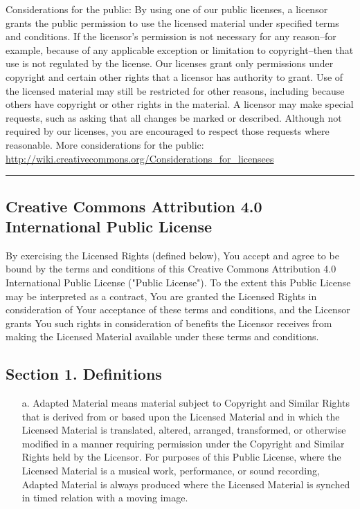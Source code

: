 \begin{scriptsize}
     Considerations for the public: By using one of our public
     licenses, a licensor grants the public permission to use the
     licensed material under specified terms and conditions. If
     the licensor's permission is not necessary for any reason--for
     example, because of any applicable exception or limitation to
     copyright--then that use is not regulated by the license. Our
     licenses grant only permissions under copyright and certain
     other rights that a licensor has authority to grant. Use of
     the licensed material may still be restricted for other
     reasons, including because others have copyright or other
     rights in the material. A licensor may make special requests,
     such as asking that all changes be marked or described.
     Although not required by our licenses, you are encouraged to
     respect those requests where reasonable. More considerations
     for the public:
	\url{http://wiki.creativecommons.org/Considerations_for_licensees}\\

\hrule

\subsection*{Creative Commons Attribution 4.0 International Public License}

By exercising the Licensed Rights (defined below), You accept and agree
to be bound by the terms and conditions of this Creative Commons
Attribution 4.0 International Public License ("Public License"). To the
extent this Public License may be interpreted as a contract, You are
granted the Licensed Rights in consideration of Your acceptance of
these terms and conditions, and the Licensor grants You such rights in
consideration of benefits the Licensor receives from making the
Licensed Material available under these terms and conditions.


\subsection*{Section 1. Definitions}

\begin{itemize}
  \item[a.] Adapted Material means material subject to Copyright and Similar
     Rights that is derived from or based upon the Licensed Material
     and in which the Licensed Material is translated, altered,
     arranged, transformed, or otherwise modified in a manner requiring
     permission under the Copyright and Similar Rights held by the
     Licensor. For purposes of this Public License, where the Licensed
     Material is a musical work, performance, or sound recording,
     Adapted Material is always produced where the Licensed Material is
     synched in timed relation with a moving image.


\end{itemize}
\end{scriptsize}
